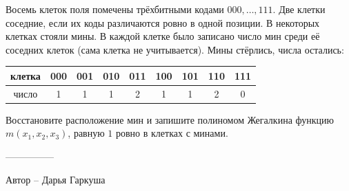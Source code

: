 \question
Восемь клеток поля помечены трёхбитными кодами $000,\dots,111$. Две клетки соседние, если их коды различаются ровно в одной позиции. В некоторых клетках стояли мины. В каждой клетке было записано число мин среди её соседних клеток (сама клетка не учитывается). Мины стёрлись, числа остались:
\begin{center}
\begin{tabular}{c|*{8}{c}}
клетка & 000 & 001 & 010 & 011 & 100 & 101 & 110 & 111 \\ \hline
число & 1 & 1 & 1 & 2 & 1 & 1 & 2 & 0
\end{tabular}
\end{center}
Восстановите расположение мин и запишите полиномом Жегалкина функцию $m(x_1,x_2,x_3)$, равную $1$ ровно в клетках с минами.

---------------

Автор -- Дарья Гаркуша